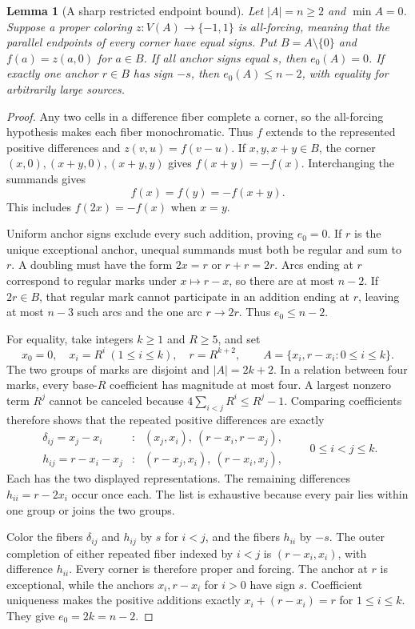 \documentclass[11pt,a4paper]{article}
\newtheorem{lemma}[theorem]{Lemma}
\theoremstyle{definition}
\numberwithin{equation}{section}
\begin{document}
\begin{lemma}[A sharp restricted endpoint bound]\label{lem:anchor}
Let $|A|=n\ge2$ and $\min A=0$. Suppose a proper coloring $z:V(A)\to\{-1,1\}$ is \emph{all-forcing}, meaning that the parallel endpoints of every corner have equal signs. Put $B=A\setminus\{0\}$ and $f(a)=z(a,0)$ for $a\in B$. If all anchor signs equal $s$, then $e_0(A)=0$. If exactly one anchor $r\in B$ has sign $-s$, then $e_0(A)\le n-2$, with equality for arbitrarily large sources.
\end{lemma}
\begin{proof}
Any two cells in a difference fiber complete a corner, so the all-forcing hypothesis makes each fiber monochromatic. Thus $f$ extends to the represented positive differences and $z(v,u)=f(v-u)$. If $x,y,x+y\in B$, the corner $(x,0),(x+y,0),(x+y,y)$ gives $f(x+y)=-f(x)$. Interchanging the summands gives
\begin{equation}\label{eq:anchor-signs}
f(x)=f(y)=-f(x+y).
\end{equation}
This includes $f(2x)=-f(x)$ when $x=y$.

Uniform anchor signs exclude every such addition, proving $e_0=0$. If $r$ is the unique exceptional anchor, unequal summands must both be regular and sum to $r$. A doubling must have the form $2x=r$ or $r+r=2r$. Arcs ending at $r$ correspond to regular marks under $x\mapsto r-x$, so there are at most $n-2$. If $2r\in B$, that regular mark cannot participate in an addition ending at $r$, leaving at most $n-3$ such arcs and the one arc $r\to2r$. Thus $e_0\le n-2$.

For equality, take integers $k\ge1$ and $R\ge5$, and set
\begin{equation}\label{eq:endpoint-sharp-family}
x_0=0,\quad x_i=R^i\ (1\le i\le k),\quad r=R^{k+2},\qquad
A=\{x_i,r-x_i:0\le i\le k\}.
\end{equation}
The two groups of marks are disjoint and $|A|=2k+2$. In a relation between four marks, every base-$R$ coefficient has magnitude at most four. A largest nonzero term $R^j$ cannot be canceled because $4\sum_{i<j}R^i\le R^j-1$. Comparing coefficients therefore shows that the repeated positive differences are exactly
\begin{equation}\label{eq:endpoint-fibers}
\begin{array}{ccl}
\delta_{ij}=x_j-x_i&:&(x_j,x_i),\ (r-x_i,r-x_j),\\
h_{ij}=r-x_i-x_j&:&(r-x_j,x_i),\ (r-x_i,x_j),
\end{array}
\qquad 0\le i<j\le k.
\end{equation}
Each has the two displayed representations. The remaining differences $h_{ii}=r-2x_i$ occur once each. The list is exhaustive because every pair lies within one group or joins the two groups.

Color the fibers $\delta_{ij}$ and $h_{ij}$ by $s$ for $i<j$, and the fibers $h_{ii}$ by $-s$. The outer completion of either repeated fiber indexed by $i<j$ is $(r-x_i,x_i)$, with difference $h_{ii}$. Every corner is therefore proper and forcing. The anchor at $r$ is exceptional, while the anchors $x_i,r-x_i$ for $i>0$ have sign $s$. Coefficient uniqueness makes the positive additions exactly $x_i+(r-x_i)=r$ for $1\le i\le k$. They give $e_0=2k=n-2$.
\end{proof}
\end{document}
